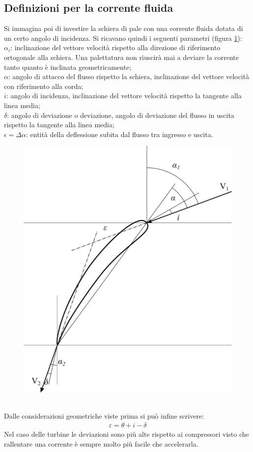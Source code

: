 \subsection{Definizioni per la corrente fluida}
Si immagina poi di investire la schiera di pale con una corrente fluida dotata di un certo angolo di incidenza. Si ricavano quindi i seguenti parametri (figura \ref{fig:palasing}):\\[1mm]
$\alpha_i$: inclinazione del vettore velocità rispetto alla direzione di riferimento ortogonale alla schiera. Una palettatura non riuscirà mai a deviare la corrente tanto quanto è inclinata geometricamente;\\
$\alpha$: angolo di attacco del flusso rispetto la schiera, inclinazione del vettore velocità con riferimento alla corda;\\
$i$: angolo di incidenza, inclinazione del vettore velocità rispetto la tangente alla linea media;\\
$\delta$: angolo di deviazione o deviazione, angolo di deviazione del flusso in uscita rispetto la tangente alla linea media;\\
$\epsilon = \Delta \alpha$: entità della deflessione subita dal flusso tra ingresso e uscita.\\[2mm]
\begin{figure}
\centering
  \includegraphics[width=.45\textwidth]{fig/palasing.pdf}
\caption{}
\label{fig:palasing}
\end{figure}
\\Dalle considerazioni geometriche viste prima si può infine scrivere:
\begin{align*}
\varepsilon = \theta + i - \delta
\end{align*}
Nel caso delle turbine le deviazioni sono più alte rispetto ai compressori visto che rallentare una corrente è sempre molto più facile che accelerarla.
